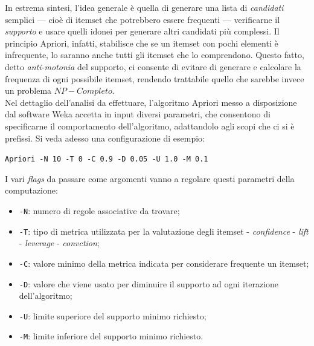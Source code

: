         In estrema sintesi, l'idea generale è quella di generare una lista di \textit{candidati} semplici --- cioè di itemset che potrebbero essere frequenti --- verificarne il \textit{supporto} e usare quelli idonei per generare altri candidati più complessi. Il principio Apriori, infatti, stabilisce che se un itemset con pochi elementi è infrequente, lo saranno anche tutti gli itemset che lo comprendono. Questo fatto, detto \textit{anti-motonia} del supporto, ci consente di evitare di generare e calcolare la frequenza di ogni possibile itemset, rendendo trattabile quello che sarebbe invece un problema $NP-Completo$. \\

        Nel dettaglio dell'analisi da effettuare, l'algoritmo Apriori messo a disposizione dal software Weka accetta in input diversi parametri, che consentono di specificarne il comportamento dell'algoritmo, adattandolo agli scopi che ci si è prefissi. Si veda adesso una configurazione di esempio:\\

        \begin{center}
            \noindent \texttt{Apriori -N 10 -T 0 -C 0.9 -D 0.05 -U 1.0 -M 0.1}
        \end{center}

        I vari \textit{flags} da passare come argomenti vanno a regolare questi parametri della computazione:

        \begin{itemize}
            \item \texttt{-N}: numero di regole associative da trovare;
            \item \texttt{-T}: tipo di metrica utilizzata per la valutazione degli itemset
                 - \textit{confidence}
                 - \textit{lift}
                 - \textit{leverage}
                 - \textit{convction};
            \item \texttt{-C}: valore minimo della metrica indicata per considerare frequente un itemset;
            \item \texttt{-D}: valore che viene usato per diminuire il supporto ad ogni iterazione dell'algoritmo;
            \item \texttt{-U}: limite superiore del supporto minimo richiesto;
            \item \texttt{-M}: limite inferiore del supporto minimo richiesto.
        \end{itemize}

